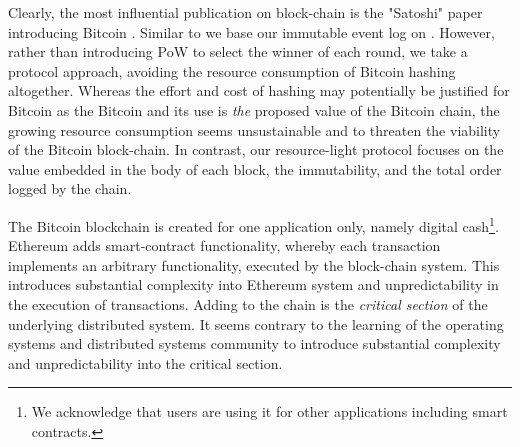 \documentclass[10pt]{article}
\begin{document}
Clearly, the most influential publication on block-chain is the "Satoshi" paper introducing Bitcoin \cite{satoshi-paper}. Similar to \cite{satoshi-paper} we base our immutable event log on \cite{massias}. However, rather than introducing PoW to select the winner of each round, we take a protocol approach, avoiding the resource consumption of Bitcoin hashing altogether. Whereas the effort and cost of hashing may potentially be justified for Bitcoin as the Bitcoin and its use is \emph{the} proposed value of the Bitcoin chain, the growing resource consumption seems unsustainable and to threaten the viability of the Bitcoin block-chain. In contrast, our resource-light protocol focuses on the value embedded in the body of each block, the immutability, and the total order logged by the chain.




The Bitcoin blockchain is created for one application only, namely digital cash\footnote{We acknowledge that users are using it for other applications including smart contracts.}. Ethereum \cite{ethereum} adds smart-contract functionality, whereby each transaction implements an arbitrary functionality, executed by the block-chain system. This introduces substantial complexity into Ethereum system and unpredictability in the execution of transactions. Adding to the chain is the \emph{critical section} of the underlying distributed system. It seems contrary to the learning of the operating systems and distributed systems community to introduce substantial complexity and unpredictability into the critical section. 
\end{document}
